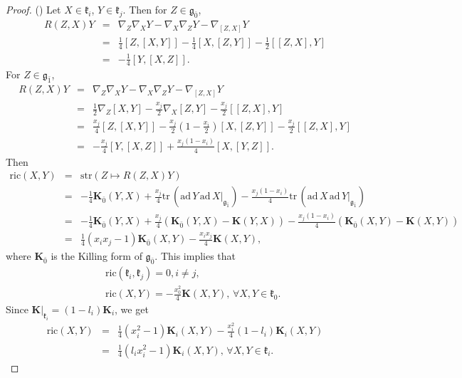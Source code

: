 \documentclass[reqno]{amsart}
\theoremstyle{definition}
\begin{document}
\begin{proof}
() Let $X\in\mathfrak{k}_{i}$, $Y\in\mathfrak{k}_{j}$. Then for  $Z\in\mathfrak{g}_{\bar{0}}$,
\begin{eqnarray*}
R(Z,X)Y&=&\nabla_{Z}\nabla_{X}Y-\nabla_{X}\nabla_{Z}Y-\nabla_{[Z,X]}Y\\
       &=&\frac{1}{4}[Z,[X,Y]]-\frac{1}{4}[X,[Z,Y]]-\frac{1}{2}[[Z,X],Y]\\
       &=&-\frac{1}{4}[Y,[X,Z]].
\end{eqnarray*}
For $Z\in\mathfrak{g}_{\bar{1}}$,
\begin{eqnarray*}
R(Z,X)Y&=&\nabla_{Z}\nabla_{X}Y-\nabla_{X}\nabla_{Z}Y-\nabla_{[Z,X]}Y\\
       &=&\frac{1}{2}\nabla_{Z}[X,Y]-\frac{x_{j}}{2}\nabla_{X}[Z,Y]-\frac{x_{j}}{2}[[Z,X],Y]\\
       &=&\frac{x_{j}}{4}[Z,[X,Y]]-\frac{x_{j}}{2}\left(1-\frac{x_{i}}{2}\right)[X,[Z,Y]]-\frac{x_{j}}{2}[[Z,X],Y]\\
       &=&-\frac{x_{j}}{4}[Y,[X,Z]]+\frac{x_{j}(1-x_{i})}{4}[X,[Y,Z]].
\end{eqnarray*}
Then
\begin{eqnarray*}
\mathrm{ric}(X,Y)&=&\mathrm{str}(Z\mapsto R(Z,X)Y)\\
                 &=&-\frac{1}{4}\mathbf{K}_{\bar{0}}(Y,X)
                 +\frac{x_{j}}{4}\mathrm{tr}\,(\mathrm{ad}\,Y\,\mathrm{ad}\,X|_{\mathfrak{g}_{\bar{1}}})
                    -\frac{x_{j}(1-x_{i})}{4}\mathrm{tr}\,(\mathrm{ad}\,X\,\mathrm{ad}\,Y|_{\mathfrak{g}_{\bar{1}}})\\
                 &=&-\frac{1}{4}\mathbf{K}_{\bar{0}}(Y,X)+\frac{x_{j}}{4}(\mathbf{K}_{\bar{0}}(Y,X)-\mathbf{K}(Y,X)) -\frac{x_{j}(1-x_{i})}{4}(\mathbf{K}_{\bar{0}}(X,Y)-\mathbf{K}(X,Y))\\
                 &=&\frac{1}{4}(x_{i}x_{j}-1)\mathbf{K}_{\bar{0}}(X,Y)-\frac{x_{i}x_{j}}{4}\mathbf{K}(X,Y),
\end{eqnarray*}
where $\mathbf{K}_{\bar{0}}$ is the Killing form of $\mathfrak{g}_{\bar{0}}$.
This implies that
\begin{eqnarray*}
&&\mathrm{ric}(\mathfrak{k}_{i},\mathfrak{k}_{j})=0, i\neq j,\\
&&\mathrm{ric}(X,Y)=-\frac{x_{0}^{2}}{4}\mathbf{K}(X,Y), \, \forall X,Y\in\mathfrak{k}_{0}.
\end{eqnarray*}
Since $\mathbf{K}|_{\mathfrak{k}_{i}}=(1-l_{i})\mathbf{K}_{i}$, we get
\begin{eqnarray*}
 \mathrm{ric}(X,Y)&=&\frac{1}{4}(x_{i}^{2}-1)\mathbf{K}_{i}(X,Y)-\frac{x_{i}^{2}}{4}(1-l_{i})\mathbf{K}_{i}(X,Y)\\
                  &=&\frac{1}{4}(l_{i}x_{i}^{2}-1)\mathbf{K}_{i}(X,Y), \,\forall X,Y\in\mathfrak{k}_{i}.
\end{eqnarray*}



\end{proof}
\end{document}
